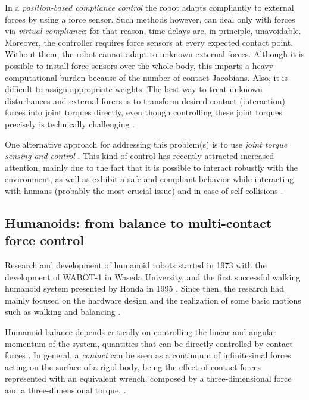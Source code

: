		In a \emph{position-based compliance control} the robot adapts compliantly to external forces by using a
		force sensor.
		Such methods however, can deal only with forces via \emph{virtual compliance}; for that reason,
		time delays are, in principle, unavoidable.
		Moreover, the controller requires force sensors at every expected contact point.
		Without them, the robot cannot adapt to unknown external forces.
		Although it is possible to install force sensors over the whole body,
		this imparts a heavy computational burden because of the number of contact Jacobians.
		Also, it is difficult to assign appropriate weights.
		The best way to treat unknown disturbances and external forces is to transform desired contact
		(interaction) forces into joint torques directly, even though controlling these joint torques
		precisely is technically challenging \cite{Hyon_TransRobotics2007}.
		
		One alternative approach for addressing this problem(s)	is to use
		\emph{joint torque sensing and control}	\cite{Khatib_ICRA2008} \cite{Ott_Humanoids2011}.
		This kind of control has recently attracted increased attention, mainly due	to the fact that
		it is possible to interact robustly with the environment, as well as exhibit a safe
		and compliant behavior while interacting with humans (probably the most crucial issue) and
		in case of self-collisions \cite{Englsberger_Humanoids2015}.
		
	\subsection{Humanoids: from balance to multi-contact force control}
		\label{sub:humanoid_robots}
		
		Research and development of humanoid robots started in 1973 with the development of WABOT-1
		in Waseda	University, and the first successful walking humanoid system presented by Honda in
		1995 \cite{Park_PhDThesis2006}.
		Since then, the research had mainly focused on the hardware design and the realization of some
		basic	motions such as walking and balancing \cite{Harada_ICRA2003}.	
		
		Humanoid balance depends critically on controlling the linear and angular momentum of the	system,
		quantities that can be directly controlled by contact forces \cite{Stephens_IROS2010}.
		In general, a \emph{contact} can be seen as a continuum of infinitesimal forces acting on
		the surface of a rigid body, being the effect of contact forces represented with an
		equivalent wrench, composed by a three-dimensional force and a three-dimensional torque.
		\cite{Nori_FrontRobAI2015}.
		
